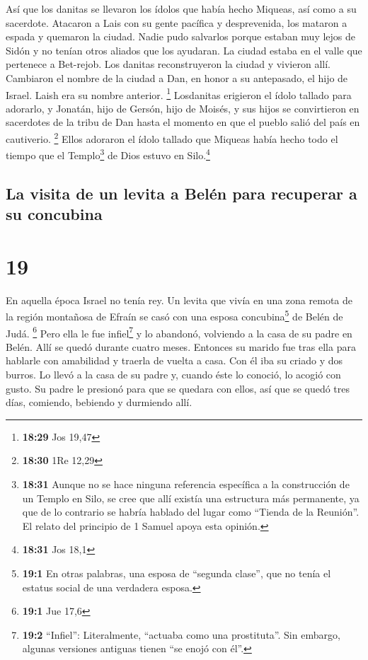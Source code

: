  Así que los danitas se llevaron los ídolos que había
hecho Miqueas, así como a su sacerdote. Atacaron a Lais con su gente
pacífica y desprevenida, los mataron a espada y quemaron la ciudad.
 Nadie pudo salvarlos porque estaban muy lejos de Sidón y
no tenían otros aliados que los ayudaran. La ciudad estaba en el valle
que pertenece a Bet-rejob. Los danitas reconstruyeron la ciudad y
vivieron allí.  Cambiaron el nombre de la ciudad a Dan,
en honor a su antepasado, el hijo de Israel. Laish era su nombre
anterior. \footnote{\textbf{18:29} Jos 19,47}  Losdanitas
erigieron el ídolo tallado para adorarlo, y Jonatán, hijo de Gersón,
hijo de Moisés, y sus hijos se convirtieron en sacerdotes de la tribu de
Dan hasta el momento en que el pueblo salió del país en cautiverio.
\footnote{\textbf{18:30} 1Re 12,29}  Ellos adoraron el
ídolo tallado que Miqueas había hecho todo el tiempo que el
Templo\footnote{\textbf{18:31} Aunque no se hace ninguna referencia
  específica a la construcción de un Templo en Silo, se cree que allí
  existía una estructura más permanente, ya que de lo contrario se
  habría hablado del lugar como ``Tienda de la Reunión''. El relato del
  principio de 1 Samuel apoya esta opinión.} de Dios estuvo en
Silo.\footnote{\textbf{18:31} Jos 18,1}

\hypertarget{la-visita-de-un-levita-a-beluxe9n-para-recuperar-a-su-concubina}{%
\subsection{La visita de un levita a Belén para recuperar a su
concubina}\label{la-visita-de-un-levita-a-beluxe9n-para-recuperar-a-su-concubina}}

\hypertarget{section-18}{%
\section{19}\label{section-18}}

 En aquella época Israel no tenía rey. Un levita que vivía
en una zona remota de la región montañosa de Efraín se casó con una
esposa concubina\footnote{\textbf{19:1} En otras palabras, una esposa de
  ``segunda clase'', que no tenía el estatus social de una verdadera
  esposa.} de Belén de Judá. \footnote{\textbf{19:1} Jue 17,6}
 Pero ella le fue infiel\footnote{\textbf{19:2}
  ``Infiel'': Literalmente, ``actuaba como una prostituta''. Sin
  embargo, algunas versiones antiguas tienen ``se enojó con él''.} y lo
abandonó, volviendo a la casa de su padre en Belén. Allí se quedó
durante cuatro meses.  Entonces su marido fue tras ella
para hablarle con amabilidad y traerla de vuelta a casa. Con él iba su
criado y dos burros. Lo llevó a la casa de su padre y, cuando éste lo
conoció, lo acogió con gusto.  Su padre le presionó para
que se quedara con ellos, así que se quedó tres días, comiendo, bebiendo
y durmiendo allí.

